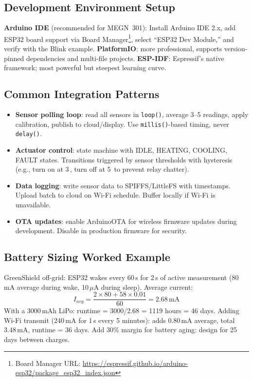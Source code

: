 \subsection{Development Environment Setup}
\textbf{Arduino IDE} (recommended for MEGN~301): Install Arduino IDE 2.x, add ESP32 board support via Board Manager\footnote{Board Manager URL: \url{https://espressif.github.io/arduino-esp32/package_esp32_index.json}}, select ``ESP32 Dev Module,'' and verify with the Blink example. \textbf{PlatformIO}: more professional, supports version-pinned dependencies and multi-file projects. \textbf{ESP-IDF}: Espressif's native framework; most powerful but steepest learning curve.

\subsection{Common Integration Patterns}
\begin{itemize}[leftmargin=1.5em]
\item \textbf{Sensor polling loop}: read all sensors in \texttt{loop()}, average 3--5 readings, apply calibration, publish to cloud/display. Use \texttt{millis()}-based timing, never \texttt{delay()}.
\item \textbf{Actuator control}: state machine with IDLE, HEATING, COOLING, FAULT states. Transitions triggered by sensor thresholds with hysteresis (e.g., turn on at 3\,\degC{}, turn off at 5\,\degC{} to prevent relay chatter).
\item \textbf{Data logging}: write sensor data to SPIFFS/LittleFS with timestamps. Upload batch to cloud on Wi-Fi schedule. Buffer locally if Wi-Fi is unavailable.
\item \textbf{OTA updates}: enable ArduinoOTA for wireless firmware updates during development. Disable in production firmware for security.
\end{itemize}

\subsection{Battery Sizing Worked Example}
GreenShield off-grid: ESP32 wakes every 60\,s for 2\,s of active measurement (80\,mA average during wake, 10\,$\mu$A during sleep). Average current:
\begin{equation}
I_{avg} = \frac{2 \times 80 + 58 \times 0.01}{60} = 2.68\,\text{mA}
\end{equation}
With a 3000\,mAh LiPo: runtime = 3000/2.68 = 1119 hours = 46 days. Adding Wi-Fi transmit (240\,mA for 1\,s every 5 minutes): adds 0.80\,mA average, total 3.48\,mA, runtime = 36 days. Add 30\% margin for battery aging: design for 25 days between charges.


